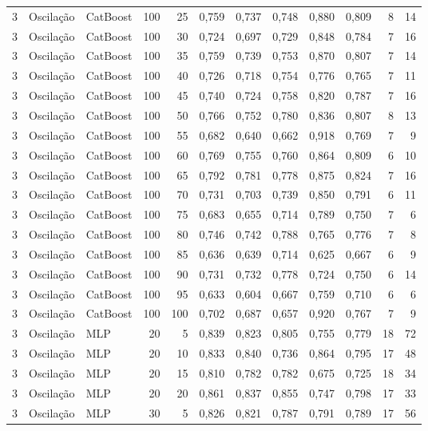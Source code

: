 \begin{longtable}{@{}rllrrrrrrrrr@{}}
3 & Oscilação & CatBoost & 100 & 25 & 0,759 & 0,737 & 0,748 & 0,880 & 0,809 & 8 & 14 \\
3 & Oscilação & CatBoost & 100 & 30 & 0,724 & 0,697 & 0,729 & 0,848 & 0,784 & 7 & 16 \\
3 & Oscilação & CatBoost & 100 & 35 & 0,759 & 0,739 & 0,753 & 0,870 & 0,807 & 7 & 14 \\
3 & Oscilação & CatBoost & 100 & 40 & 0,726 & 0,718 & 0,754 & 0,776 & 0,765 & 7 & 11 \\
3 & Oscilação & CatBoost & 100 & 45 & 0,740 & 0,724 & 0,758 & 0,820 & 0,787 & 7 & 16 \\
3 & Oscilação & CatBoost & 100 & 50 & 0,766 & 0,752 & 0,780 & 0,836 & 0,807 & 8 & 13 \\
3 & Oscilação & CatBoost & 100 & 55 & 0,682 & 0,640 & 0,662 & 0,918 & 0,769 & 7 & 9 \\
3 & Oscilação & CatBoost & 100 & 60 & 0,769 & 0,755 & 0,760 & 0,864 & 0,809 & 6 & 10 \\
3 & Oscilação & CatBoost & 100 & 65 & 0,792 & 0,781 & 0,778 & 0,875 & 0,824 & 7 & 16 \\
3 & Oscilação & CatBoost & 100 & 70 & 0,731 & 0,703 & 0,739 & 0,850 & 0,791 & 6 & 11 \\
3 & Oscilação & CatBoost & 100 & 75 & 0,683 & 0,655 & 0,714 & 0,789 & 0,750 & 7 & 6 \\
3 & Oscilação & CatBoost & 100 & 80 & 0,746 & 0,742 & 0,788 & 0,765 & 0,776 & 7 & 8 \\
3 & Oscilação & CatBoost & 100 & 85 & 0,636 & 0,639 & 0,714 & 0,625 & 0,667 & 6 & 9 \\
3 & Oscilação & CatBoost & 100 & 90 & 0,731 & 0,732 & 0,778 & 0,724 & 0,750 & 6 & 14 \\
3 & Oscilação & CatBoost & 100 & 95 & 0,633 & 0,604 & 0,667 & 0,759 & 0,710 & 6 & 6 \\
3 & Oscilação & CatBoost & 100 & 100 & 0,702 & 0,687 & 0,657 & 0,920 & 0,767 & 7 & 9 \\
3 & Oscilação & MLP & 20 & 5 & 0,839 & 0,823 & 0,805 & 0,755 & 0,779 & 18 & 72 \\
3 & Oscilação & MLP & 20 & 10 & 0,833 & 0,840 & 0,736 & 0,864 & 0,795 & 17 & 48 \\
3 & Oscilação & MLP & 20 & 15 & 0,810 & 0,782 & 0,782 & 0,675 & 0,725 & 18 & 34 \\
3 & Oscilação & MLP & 20 & 20 & 0,861 & 0,837 & 0,855 & 0,747 & 0,798 & 17 & 33 \\
3 & Oscilação & MLP & 30 & 5 & 0,826 & 0,821 & 0,787 & 0,791 & 0,789 & 17 & 56 \\

\end{longtable}
